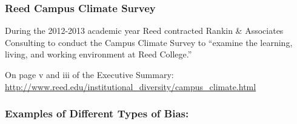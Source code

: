 \documentclass[handout]{beamer}
\newcommand{\blue}[1]{\textcolor{blue2}{#1}}
\begin{document}
\begin{frame}
\frametitle{Reed Campus Climate Survey}

During the 2012-2013 academic year Reed contracted Rankin \& Associates Consulting to conduct the Campus Climate Survey to ``examine the learning, living, and working environment at Reed College.''

\vspace{0.5cm}

\pause On page v and iii of the Executive Summary: \blue{\href{http://www.reed.edu/institutional\_diversity/campus\_climate.html}{http://www.reed.edu/institutional\_diversity/campus\_climate.html}}


\end{frame}


\begin{frame}
\frametitle{Examples of Different Types of Bias:}


\end{frame}
\end{document}
